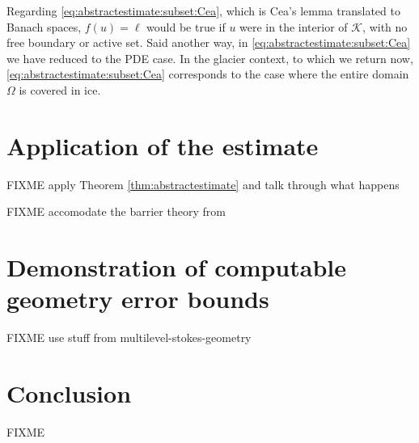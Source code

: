 \documentclass[hidelinks,onefignum,onetabnum,final]{siamart220329}  %
\newcommand{\cK}{\mathcal{K}}
\begin{document}
Regarding \eqref{eq:abstractestimate:subset:Cea}, which is Cea's lemma \cite[Theorem 2.4.1]{Ciarlet2002} translated to Banach spaces, $f(u)=\ell$ would be true if $u$ were in the interior of $\cK$, with no free boundary or active set.  Said another way, in \eqref{eq:abstractestimate:subset:Cea} we have reduced to the PDE case.  In the glacier context, to which we return now, \eqref{eq:abstractestimate:subset:Cea} corresponds to the case where the entire domain $\Omega$ is covered in ice.


\section{Application of the estimate} \label{sec:application}

FIXME apply Theorem \ref{thm:abstractestimate} and talk through what happens

FIXME accomodate the barrier theory from \cite{Bueler2021conservation}


\section{Demonstration of computable geometry error bounds} \label{sec:demo}

FIXME use stuff from multilevel-stokes-geometry


\section{Conclusion} \label{sec:conclusion}

FIXME




\end{document}
